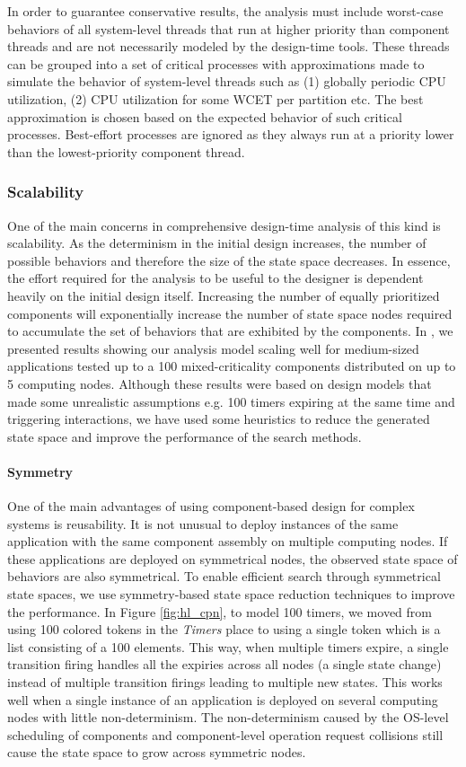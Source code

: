 In order to guarantee conservative results, the analysis must include worst-case behaviors of all system-level threads that run at higher priority than component threads and are not necessarily modeled by the design-time tools. These threads can be grouped into a set of critical processes with approximations made to simulate the behavior of system-level threads such as (1) globally periodic CPU utilization, (2) CPU utilization for some WCET per partition etc. The best approximation is chosen based on the expected behavior of such critical processes. Best-effort processes are ignored as they always run at a priority lower than the lowest-priority component thread.


\subsubsection{Scalability}
One of the main concerns in comprehensive design-time analysis of this kind is scalability. As the determinism in the initial design increases, the number of possible behaviors and therefore the size of the state space decreases. In essence, the effort required for the analysis to be useful to the designer is dependent heavily on the initial design itself. Increasing the number of equally prioritized components will exponentially increase the number of state space nodes required to accumulate the set of behaviors that are exhibited by the components. In \cite{MoDeVVa}, we presented results showing our analysis model scaling well for medium-sized applications tested up to a 100 mixed-criticality components distributed on up to 5 computing nodes. Although these results were based on design models that made some unrealistic assumptions e.g. 100 timers expiring at the same time and triggering interactions, we have used some heuristics to reduce the generated state space and improve the performance of the search methods. 
\paragraph{Symmetry}
One of the main advantages of using component-based design for complex systems is reusability. It is not unusual to deploy instances of the same application with the same component assembly on multiple computing nodes. If these applications are deployed on symmetrical nodes, the observed state space of behaviors are also symmetrical. To enable efficient search through symmetrical state spaces, we use symmetry-based state space reduction techniques \cite{Kristensen2000} to improve the performance. In Figure \ref{fig:hl_cpn}, to model 100 timers, we moved from using 100 colored tokens in the \emph{Timers} place to using a single token which is a list consisting of a 100 elements. This way, when multiple timers expire, a single transition firing handles all the expiries across all nodes (a single state change) instead of multiple transition firings leading to multiple new states. This works well when a single instance of an application is deployed on several computing nodes with little non-determinism. The non-determinism caused by the OS-level scheduling of components and component-level operation request collisions still cause the state space to grow across symmetric nodes. 
